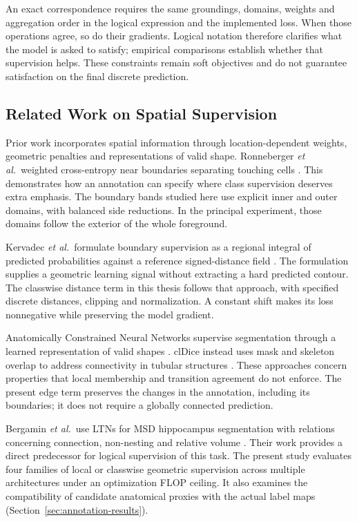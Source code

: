 \documentclass[12pt,a4paper]{article}
\begin{document}
An exact correspondence requires the same groundings, domains, weights
and aggregation order in the logical expression and the implemented loss.
When those operations agree, so do their gradients. Logical notation
therefore clarifies what the model is asked to satisfy; empirical
comparisons establish whether that supervision helps. These constraints
remain soft objectives and do not guarantee satisfaction on the final
discrete prediction.

\subsection{Related Work on Spatial Supervision}\label{sec:spatial-related-work}

Prior work incorporates spatial information through location-dependent
weights, geometric penalties and representations of valid shape.
Ronneberger \emph{et al.}\ weighted cross-entropy near boundaries separating
touching cells \cite{ronneberger2015unet}. This demonstrates how an
annotation can specify where class supervision deserves extra emphasis.
The boundary bands studied here use explicit inner and outer domains,
with balanced side reductions. In the principal experiment, those domains
follow the exterior of the whole foreground.

Kervadec \emph{et al.}\ formulate boundary supervision as a regional integral
of predicted probabilities against a reference signed-distance field
\cite{kervadec2019boundary}. The formulation supplies a geometric
learning signal without extracting a hard predicted contour. The
classwise distance term in this thesis follows that approach, with
specified discrete distances, clipping and normalization. A constant
shift makes its loss nonnegative while preserving the model gradient.

Anatomically Constrained Neural Networks supervise segmentation through
a learned representation of valid shapes \cite{oktay2017anatomically}.
clDice instead uses mask and skeleton overlap to address connectivity
in tubular structures \cite{shit2021cldice}. These approaches concern
properties that local membership and transition agreement do not enforce.
The present edge term preserves the changes in the annotation, including
its boundaries; it does not require a globally connected prediction.

Bergamin \emph{et al.}\ use LTNs for MSD hippocampus segmentation with relations
concerning connection, non-nesting and relative volume
\cite{bergamin2025integrating}. Their work provides a direct predecessor
for logical supervision of this task. The present study evaluates four
families of local or classwise geometric supervision across multiple
architectures under an optimization FLOP ceiling. It also examines the
compatibility of candidate anatomical proxies with the actual label maps
(Section~\ref{sec:annotation-results}).
\end{document}
